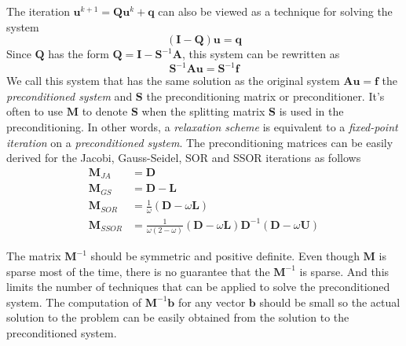 The iteration $\boldsymbol{u}^{k+1} = \boldsymbol{Q}\boldsymbol{u}^k + \boldsymbol{q}$ can also be viewed as a technique for solving the system
\begin{equation}
    (\boldsymbol{I} - \boldsymbol{Q})\boldsymbol{u} = \boldsymbol{q}
\end{equation}
Since $\boldsymbol{Q}$ has the form $\boldsymbol{Q} = \boldsymbol{I} - \boldsymbol{S}^{-1}\boldsymbol{A}$, this system can be rewritten as
\begin{equation}
    \boldsymbol{S}^{-1}\boldsymbol{A}\boldsymbol{u} = \boldsymbol{S}^{-1}\boldsymbol{f}
    \label{eqn:preconditioned-system}
\end{equation}
We call this system that has the same solution as the original system $\boldsymbol{A}\boldsymbol{u} = \boldsymbol{f}$ the \textit{preconditioned system} and $\boldsymbol{S}$ the preconditioning matrix or preconditioner. It's often to use $\boldsymbol{M}$ to denote $\boldsymbol{S}$ when the splitting matrix $\boldsymbol{S}$ is used in the preconditioning. In other words, a \textit{relaxation scheme} is equivalent to a \textit{fixed-point iteration} on a \textit{preconditioned system}.
The preconditioning matrices can be easily derived for the Jacobi, Gauss-Seidel, SOR and SSOR iterations as follows
\begin{align}
    \boldsymbol{M}_{JA} &= \boldsymbol{D} \\
    \boldsymbol{M}_{GS} &= \boldsymbol{D} - \boldsymbol{L} \\
    \boldsymbol{M}_{SOR} &= \frac{1}{\omega}(\boldsymbol{D} - \omega\boldsymbol{L}) \\
    \boldsymbol{M}_{SSOR} &= \frac{1}{\omega(2-\omega)}(\boldsymbol{D} - \omega\boldsymbol{L})\boldsymbol{D}^{-1}(\boldsymbol{D} - \omega\boldsymbol{U})
\end{align}




The matrix $\boldsymbol{M}^{-1}$ should be symmetric and positive definite. Even though $\boldsymbol{M}$ is sparse most of the time, there is no guarantee that the $\boldsymbol{M}^{-1}$ is sparse. And this limits the number of techniques that can be applied to solve the preconditioned system. The computation of $\boldsymbol{M}^{-1}\boldsymbol{b}$ for any vector $\boldsymbol{b}$ should be small so the actual solution to the problem can be easily obtained from the solution to the preconditioned system.


